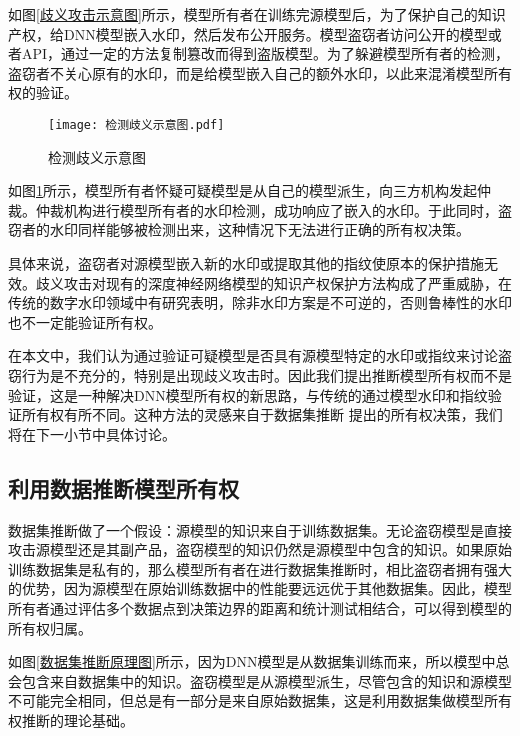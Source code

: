 如图\ref{歧义攻击示意图}所示，模型所有者在训练完源模型后，为了保护自己的知识产权，给DNN模型嵌入水印，然后发布公开服务。模型盗窃者访问公开的模型或者API，通过一定的方法复制篡改而得到盗版模型。为了躲避模型所有者的检测，盗窃者不关心原有的水印，而是给模型嵌入自己的额外水印，以此来混淆模型所有权的验证。

\begin{figure}[htbp]%
	\centering
	\setlength{\abovecaptionskip}{3mm} %
	\vspace{-2mm}
	\setlength{\belowcaptionskip}{-3mm} %
	\texttt{[image: 检测歧义示意图.pdf]}
	\caption{检测歧义示意图}
	\label{检测歧义示意图}
	\end {figure}
	
如图\ref{检测歧义示意图}所示，模型所有者怀疑可疑模型是从自己的模型派生，向三方机构发起仲裁。仲裁机构进行模型所有者的水印检测，成功响应了嵌入的水印。于此同时，盗窃者的水印同样能够被检测出来，这种情况下无法进行正确的所有权决策。

具体来说，盗窃者对源模型嵌入新的水印或提取其他的指纹使原本的保护措施无效。歧义攻击对现有的深度神经网络模型的知识产权保护方法构成了严重威胁，在传统的数字水印领域中有研究表明，除非水印方案是不可逆的\cite{fan2019rethinking}，否则鲁棒性的水印也不一定能验证所有权。

在本文中，我们认为通过验证可疑模型是否具有源模型特定的水印或指纹来讨论盗窃行为是不充分的，特别是出现歧义攻击时。因此我们提出推断模型所有权而不是验证，这是一种解决DNN模型所有权的新思路，与传统的通过模型水印和指纹验证所有权有所不同。这种方法的灵感来自于数据集推断\cite{maini2021dataset} 提出的所有权决策，我们将在下一小节中具体讨论。

\subsection{利用数据推断模型所有权}\label{4.1.2}

数据集推断做了一个假设：源模型的知识来自于训练数据集。无论盗窃模型是直接攻击源模型还是其副产品，盗窃模型的知识仍然是源模型中包含的知识。如果原始训练数据集是私有的，那么模型所有者在进行数据集推断时，相比盗窃者拥有强大的优势，因为源模型在原始训练数据中的性能要远远优于其他数据集。因此，模型所有者通过评估多个数据点到决策边界的距离和统计测试相结合，可以得到模型的所有权归属。

如图\ref{数据集推断原理图}所示，因为DNN模型是从数据集训练而来，所以模型中总会包含来自数据集中的知识。盗窃模型是从源模型派生，尽管包含的知识和源模型不可能完全相同，但总是有一部分是来自原始数据集，这是利用数据集做模型所有权推断的理论基础。

